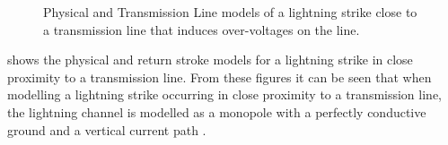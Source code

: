 \begin{figure}[htbp]
    \centering
    \caption[]{ Physical and  Transmission Line models of a lightning strike close to a transmission line that induces over-voltages on the line.}
    \label{fig:induced_voltage_models}
\end{figure}
 shows the  physical and  return stroke models for a lightning strike in close proximity to a transmission line. From these figures it can be seen that when modelling a lightning strike occurring in close proximity to a transmission line, the lightning channel is modelled as a monopole with a perfectly conductive ground and a vertical current path \cite{Paolone2009,Baba2007,McAfee2015}.

